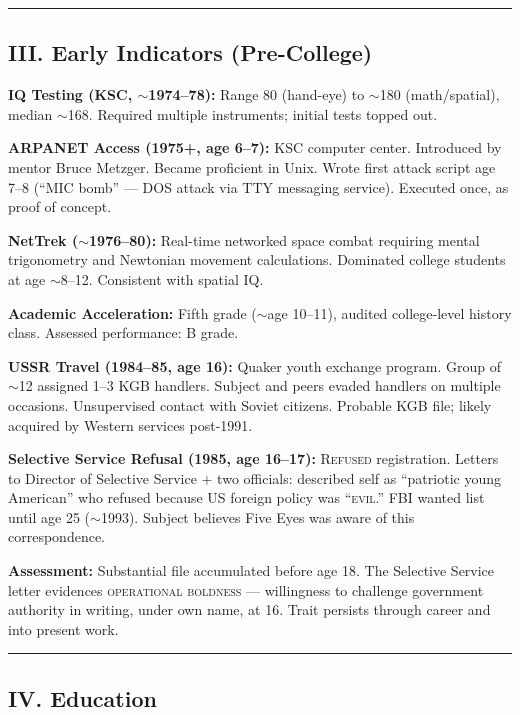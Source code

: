 \vspace{1cm}\hrule\vspace{1cm}

\subsection*{III. Early Indicators (Pre-College)}
\label{interlude:early-indicators-pre-college}

\textbf{IQ Testing (KSC, $\sim$1974--78):} Range 80 (hand-eye) to $\sim$180 (math/spatial), median $\sim$168. Required multiple instruments; initial tests topped out.

\textbf{ARPANET Access (1975+, age 6--7):} KSC computer center. Introduced by mentor Bruce Metzger. Became proficient in Unix. Wrote first attack script age 7--8 (``MIC bomb'' --- DOS attack via TTY messaging service). Executed once, as proof of concept.

\textbf{NetTrek ($\sim$1976--80):} Real-time networked space combat requiring mental trigonometry and Newtonian movement calculations. Dominated college students at age $\sim$8--12. Consistent with spatial IQ.

\textbf{Academic Acceleration:} Fifth grade ($\sim$age 10--11), audited college-level history class. Assessed performance: B grade.

\textbf{USSR Travel (1984--85, age 16):} Quaker youth exchange program. Group of $\sim$12 assigned 1--3 KGB handlers. Subject and peers evaded handlers on multiple occasions. Unsupervised contact with Soviet citizens. Probable KGB file; likely acquired by Western services post-1991.

\textbf{Selective Service Refusal (1985, age 16--17):} \textsc{Refused} registration. Letters to Director of Selective Service + two officials: described self as ``patriotic young American'' who refused because US foreign policy was ``\textsc{evil}.'' FBI wanted list until age 25 ($\sim$1993). Subject believes Five Eyes was aware of this correspondence.

\textbf{Assessment:} Substantial file accumulated before age 18. The Selective Service letter evidences \textsc{operational boldness} --- willingness to challenge government authority in writing, under own name, at 16. Trait persists through career and into present work.

\vspace{1cm}\hrule\vspace{1cm}

\subsection*{IV. Education}
\label{interlude:education}

